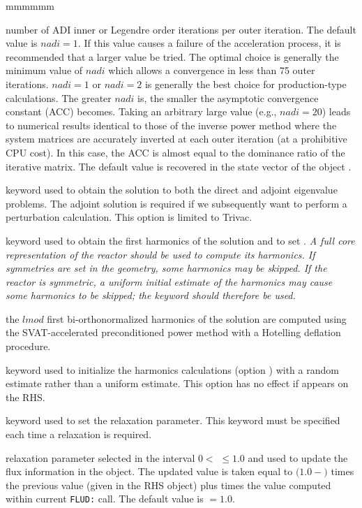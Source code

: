 \begin{ListeDeDescription}{mmmmmm}
\item[\dusa{nadi}] number of ADI inner or Legendre order iterations per outer iteration. The default value is $nadi=1$. If this value causes a failure of the acceleration process, it is recommended that a larger value be tried. The optimal
choice is generally the minimum value of $nadi$ which allows a convergence in
less than 75 outer iterations. $nadi=1$ or $nadi=2$ is generally the best
choice for production-type calculations. The greater $nadi$ is, the smaller 
the asymptotic convergence constant (ACC) becomes. Taking an arbitrary large
value (e.g., $nadi=20$) leads to numerical results identical to those of the
inverse power method where the system matrices are accurately inverted at each
outer iteration (at a prohibitive CPU cost). In this case, the ACC is almost
equal to the dominance ratio of the iterative matrix. The default value is
recovered in the state vector of the  object .

\item[\moc{ADJ}] keyword used to obtain the solution to both the direct and adjoint eigenvalue problems.
The adjoint solution is required if we subsequently want to perform a perturbation calculation. This option is limited to Trivac.

\item[\moc{MONI}] keyword used to obtain the first harmonics of the solution and to set . {\sl A full core representation of the reactor should be used to compute its harmonics. If symmetries are set in the geometry, some harmonics may be skipped. If the reactor is symmetric, a uniform initial estimate of the harmonics may cause some harmonics to be skipped; the keyword  should therefore be used.}

\item[\dusa{lmod}] the $lmod$ first bi-orthonormalized harmonics of the solution are computed using the SVAT-accelerated preconditioned power method with a Hotelling deflation procedure.\cite{wilkinson}

\item[\moc{RAND}] keyword used to initialize the harmonics  calculations
(option ) with a random estimate rather than a uniform estimate.
This option has no effect if  appears on the RHS.

\item[\moc{RELAX}] keyword used to set the relaxation parameter. This keyword must be specified each time a relaxation is required.

\item[\dusa{relax}] relaxation parameter selected in the interval $0<$  $\le 1.0$ and used to update
the flux information in the  object. The updated value is taken equal to
$(1.0-$$)$ times the previous value (given in the RHS  object) plus  times the value computed within current {\tt FLUD:} call.
The default value is  $=1.0$.

\end{ListeDeDescription}
\clearpage

